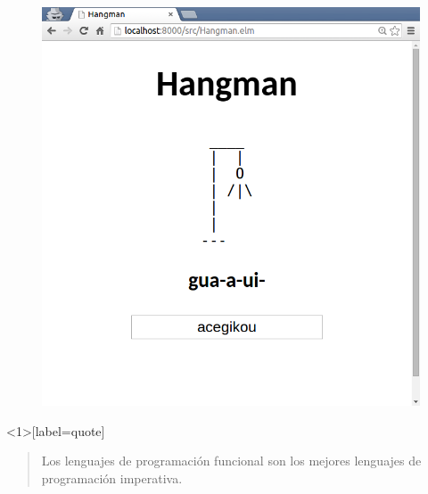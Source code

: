 \documentclass[spanish]{beamer}
\begin{document}
\begin{frame}
  \begin{figure}
    \includegraphics[height=.9\textheight]{elm-hangman-1.png}
  \end{figure}
\end{frame}


\begin{frame}<1>[label=quote]
  \begin{quote}
    Los lenguajes de programación funcional son los mejores lenguajes
    de programación imperativa.
  \end{quote}
\end{frame}

\end{document}
